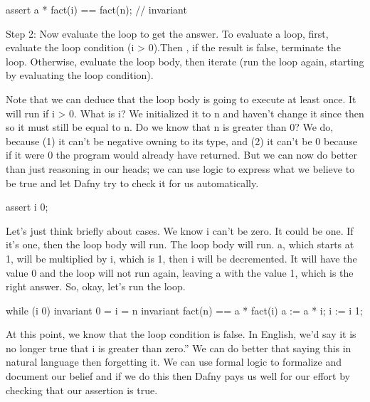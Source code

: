 \documentclass[letterpaper,10pt,english]{sphinxmanual}
\begin{document}
\begin{sphinxVerbatim}[commandchars=\\\{\}]
assert a * fact(i) == fact(n); // \PYGZdq{}invariant\PYGZdq{}
\end{sphinxVerbatim}

Step 2: Now evaluate the loop to get the answer. To evaluate a loop,
first, evaluate the loop condition (i \textgreater{} 0).Then , if the result is
false, terminate the loop. Otherwise, evaluate the loop body, then
iterate (run the loop again, starting by evaluating the loop
condition).

Note that we can deduce that the loop body is going to execute at
least once. It will run if i \textgreater{} 0. What is i? We initialized it to n
and haven’t change it since then so it must still be equal to n. Do we
know that n is greater than 0? We do, because (1) it can’t be negative
owning to its type, and (2) it can’t be 0 because if it were 0 the
program would already have returned. But we can now do better than
just reasoning in our heads; we can use logic to express what we
believe to be true and let Dafny try to check it for us automatically.

\begin{sphinxVerbatim}[commandchars=\\\{\}]
assert i \PYGZgt{} 0;
\end{sphinxVerbatim}

Let’s just think briefly about cases. We know i can’t be zero. It
could be one. If it’s one, then the loop body will run. The loop body
will run. a, which starts at 1, will be multiplied by i, which is 1,
then i will be decremented.  It will have the value 0 and the loop
will not run again, leaving a with the value 1, which is the right
answer. So, okay, let’s run the loop.

\begin{sphinxVerbatim}[commandchars=\\\{\}]
while (i \PYGZgt{}  0)
    invariant 0 \PYGZlt{}= i \PYGZlt{}= n
    invariant fact(n) == a * fact(i)
\PYGZob{}
    a := a * i;
    i := i \PYGZhy{} 1;
\PYGZcb{}
\end{sphinxVerbatim}

At this point, we know that the loop condition is false. In English,
we’d say it is no longer true that i is greater than zero.” We can do
better that saying this in natural language then forgetting it. We can
use formal logic to formalize and document our belief and if we do
this then Dafny pays us well for our effort by checking that our
assertion is true.
\end{document}
